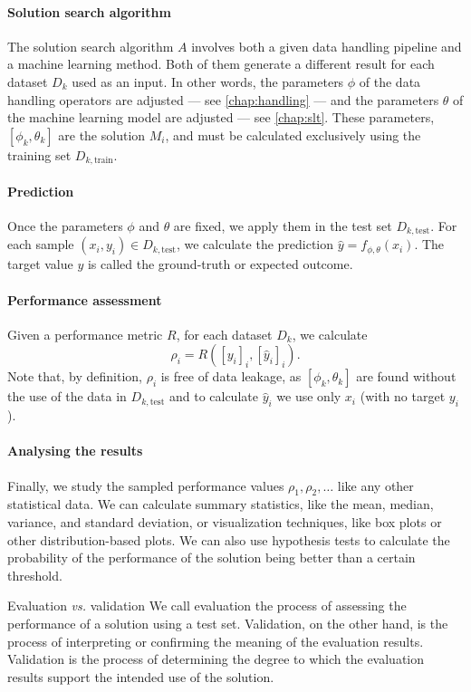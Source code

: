 \paragraph{Solution search algorithm}  The solution search algorithm $A$ involves both a
given data handling pipeline and a machine learning method.  Both of them generate a
different result for each dataset $D_k$ used as an input.  In other words, the parameters
$\phi$ of the data handling operators are adjusted --- see \cref{chap:handling} --- and the
parameters $\theta$ of the machine learning model are adjusted --- see \cref{chap:slt}.
These parameters, $\left[\phi_k, \theta_k\right]$ are the solution $M_i$, and must be
calculated exclusively using the training set $D_{k,\text{train}}$.

\paragraph{Prediction}  Once the parameters $\phi$ and $\theta$ are fixed, we apply them
in the test set $D_{k,\text{test}}$.  For each sample $(x_i, y_i) \in D_{k,\text{test}}$,
we calculate the prediction $\hat{y} = f_{\phi,\theta}(x_i)$.  The target value $y$ is
called the ground-truth or expected outcome.

\paragraph{Performance assessment} Given a performance metric $R$, for each dataset $D_k$,
we calculate
$$\rho_i = R\!\left(\left[y_i\right]_i, \left[\hat{y}_i\right]_i\right)\text{.}$$
Note that, by definition, $\rho_i$ is free of data leakage, as $\left[\phi_k,
\theta_k\right]$ are found without the use of the data in $D_{k,\text{test}}$ and to
calculate $\hat{y}_i$ we use only $x_i$ (with no target $y_i$).

\paragraph{Analysing the results} Finally, we study the sampled performance values $\rho_1,
\rho_2, \ldots$ like any other statistical data.  We can calculate summary statistics, like
the mean, median, variance, and standard deviation, or visualization techniques, like
box plots or other distribution-based plots.  We can also use hypothesis tests to
calculate the probability of the performance of the solution being better than a certain
threshold.

\begin{mainbox}{Evaluation \emph{vs.} validation}
  We call evaluation the process of assessing the performance of a solution using a
  test set.  Validation, on the other hand, is the process of interpreting or confirming
  the meaning of the evaluation results.  Validation is the process of determining the
  degree to which the evaluation results support the intended use of the solution.
\end{mainbox}

